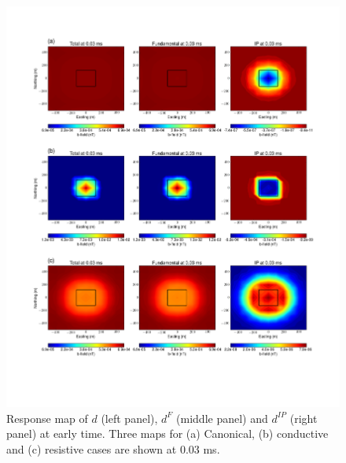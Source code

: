 \documentclass[a4paper, 11pt]{article}
\begin{document}
\begin{figure}[htb]
  \centering  \includegraphics[width=1.0\textwidth]{figures/threecasesresp/IPresp_ch6.png}
  \caption{Response map of $d$ (left panel), $d^{F}$ (middle panel) and $d^{IP}$ (right panel) at early time. Three maps for  (a) Canonical, (b) conductive and (c) resistive cases are shown at 0.03 ms.}
  \label{F:IPresp1}
\end{figure}
\end{document}
